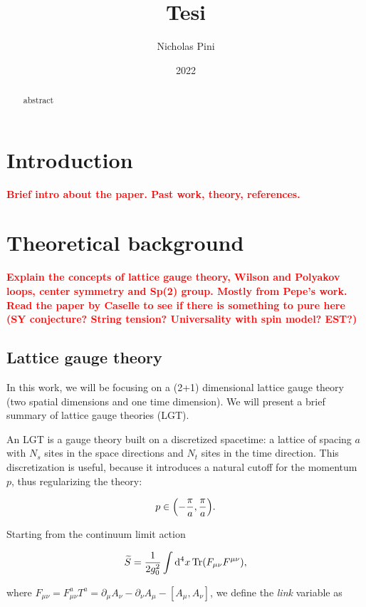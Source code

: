\documentclass[reqno,12pt]{article}
\title{Tesi}
\date{2022}
\author{Nicholas Pini}
\numberwithin{equation}{section}
\newcommand{\red}[1]{\textbf{\textcolor{red}{#1}}}
\begin{document}
\maketitle

\begin{abstract}
	abstract
\end{abstract}

\tableofcontents

\section{Introduction}
\red{Brief intro about the paper. Past work, theory, references.}


\section{Theoretical background}
\red{Explain the concepts of lattice gauge theory, Wilson and Polyakov loops, center symmetry and Sp(2) group. 
Mostly from Pepe's work. Read the paper by Caselle to see if there is something to pure here (SY conjecture? String tension? 
Universality with spin model? EST?)}

\subsection{Lattice gauge theory}
In this work, we will be focusing on a (2+1) dimensional lattice gauge theory (two spatial dimensions and one time dimension).
We will present a brief summary of lattice gauge theories (LGT).

An LGT is a gauge theory built on a discretized spacetime: a lattice of spacing $a$ with $N_s$ sites in the space directions
and $N_t$ sites in the time direction. This discretization is useful, because it introduces a natural cutoff for the momentum $p$, thus 
regularizing the theory:

\begin{equation}
	p \in \qty(-\frac{\pi}{a}, \frac{\pi}{a}).
\end{equation}

Starting from the continuum limit action

\begin{equation}
	\widetilde{S} = \frac{1}{2g_0^2} \int \dd[4]{x} \Tr(F_{\mu\nu}F^{\mu\nu}),
\end{equation}

where $F_{\mu\nu} = F_{\mu\nu}^a T^a = \partial_\mu A_\nu - \partial_\nu A_\mu - [A_\mu, A_\nu]$, we define the \textit{link} variable
as
\end{document}
